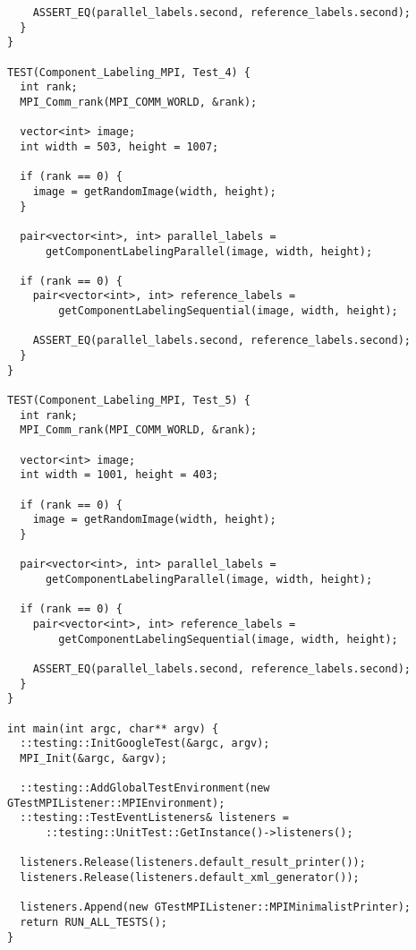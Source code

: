 \documentclass{report}
\begin{document}
\begin{lstlisting}
    ASSERT_EQ(parallel_labels.second, reference_labels.second);
  }
}

TEST(Component_Labeling_MPI, Test_4) {
  int rank;
  MPI_Comm_rank(MPI_COMM_WORLD, &rank);

  vector<int> image;
  int width = 503, height = 1007;

  if (rank == 0) {
    image = getRandomImage(width, height);
  }

  pair<vector<int>, int> parallel_labels =
      getComponentLabelingParallel(image, width, height);

  if (rank == 0) {
    pair<vector<int>, int> reference_labels =
        getComponentLabelingSequential(image, width, height);

    ASSERT_EQ(parallel_labels.second, reference_labels.second);
  }
}

TEST(Component_Labeling_MPI, Test_5) {
  int rank;
  MPI_Comm_rank(MPI_COMM_WORLD, &rank);

  vector<int> image;
  int width = 1001, height = 403;

  if (rank == 0) {
    image = getRandomImage(width, height);
  }

  pair<vector<int>, int> parallel_labels =
      getComponentLabelingParallel(image, width, height);

  if (rank == 0) {
    pair<vector<int>, int> reference_labels =
        getComponentLabelingSequential(image, width, height);

    ASSERT_EQ(parallel_labels.second, reference_labels.second);
  }
}

int main(int argc, char** argv) {
  ::testing::InitGoogleTest(&argc, argv);
  MPI_Init(&argc, &argv);

  ::testing::AddGlobalTestEnvironment(new GTestMPIListener::MPIEnvironment);
  ::testing::TestEventListeners& listeners =
      ::testing::UnitTest::GetInstance()->listeners();

  listeners.Release(listeners.default_result_printer());
  listeners.Release(listeners.default_xml_generator());

  listeners.Append(new GTestMPIListener::MPIMinimalistPrinter);
  return RUN_ALL_TESTS();
}
	\end{lstlisting}
\end{document}

